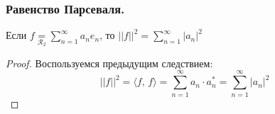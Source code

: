 \subsubsection{Равенство Парсеваля.}
\begin{corollary}[3]
    Если $f \underset{\mathcal{R}_2}{=} \sum_{n = 1}^{\infty} a_n e_n$, то $\lvert \lvert f \rvert \rvert^2 = \sum_{n = 1}^{\infty} \lvert a_n \rvert^2$
\end{corollary}
\begin{proof}
    Воспользуемся предыдущим следствием:
    \[\lvert \lvert f \rvert \rvert^2 = \langle f,\, f \rangle = \sum_{n=1}^\infty a_n \cdot a_n^* = \sum_{n=1}^{\infty} \lvert a_n \rvert^2 \]
\end{proof}